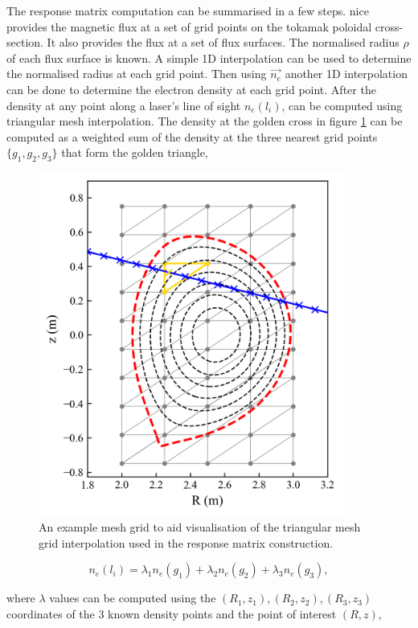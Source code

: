 The response matrix computation can be summarised in a few steps. \Gls{nice} provides the magnetic flux at a set of grid points on the tokamak poloidal cross-section. It also provides the flux at a set of flux surfaces. The normalised radius $\rho$ of each flux surface is known. A simple 1D interpolation can be used to determine the normalised radius at each grid point. Then using $\vec{n_e}$ another 1D interpolation can be done to determine the electron density at each grid point. After the density at any point along a laser's line of sight $n_e(l_i)$, can be computed using triangular mesh interpolation. The density at the golden cross in figure \ref{fig:meshtriangle} can be computed as a weighted sum of the density at the three nearest grid points $\{g_1, g_2, g_3\}$ that form the golden triangle,

\begin{figure}
  \centering
  \includegraphics[width=10cm]{images/meshtriangle.png}
  \caption{An example mesh grid to aid visualisation of the triangular mesh grid interpolation used in the response matrix construction.}
  \label{fig:meshtriangle}
\end{figure}

\begin{equation}
  n_e(l_i) = \lambda_1 n_e(g_1) + \lambda_2 n_e(g_2) + \lambda_3 n_e(g_3),
\end{equation}

\noindent where $\lambda$ values can be computed using the $(R_1,z_1), (R_2,z_2), (R_3,z_3)$ coordinates of the 3 known density points and the point of interest $(R, z)$,

